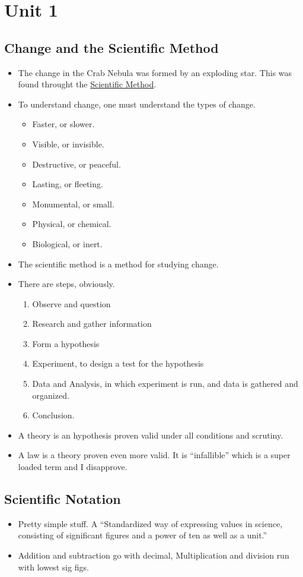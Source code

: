 \documentclass[11pt]{article}
\begin{document}
\section{Unit 1}
\subsection{Change and the Scientific Method}
\begin{itemize}
\item The change in the Crab Nebula was formed by an exploding star.  This
    was found throught the \underline{Scientific Method}.  
\item To understand change, one must understand the types of change.
  \begin{itemize}
    \item Faster, or slower.
    \item Visible, or invisible.
    \item Destructive, or peaceful.
    \item Lasting, or fleeting.
    \item Monumental, or small.
    \item Physical, or chemical.
    \item Biological, or inert.
  \end{itemize}
\item The scientific method is a method for studying change.
\item There are steps, obviously.
  \begin{enumerate}
    \item Observe and question
    \item Research and gather information
    \item Form a hypothesis
    \item Experiment, to design a test for the hypothesis
    \item Data and Analysis, in which experiment is run, and data is gathered
            and organized.
    \item Conclusion.
  \end{enumerate}
\item A theory is an hypothesis proven valid under all conditions and
    scrutiny.
\item A law is a theory proven even more valid.  It is ``infallible'' which
    is a super loaded term and I disapprove.
\end{itemize}
\subsection{Scientific Notation}
\begin{itemize}
	\item Pretty simple stuff.  A ``Standardized way of expressing values in
		science, consisting of significant figures and a power of ten as well as a
		unit.''
	\item Addition and subtraction go with decimal, Multiplication and division
		run with lowest sig figs.
\end{itemize}
\end{document}
